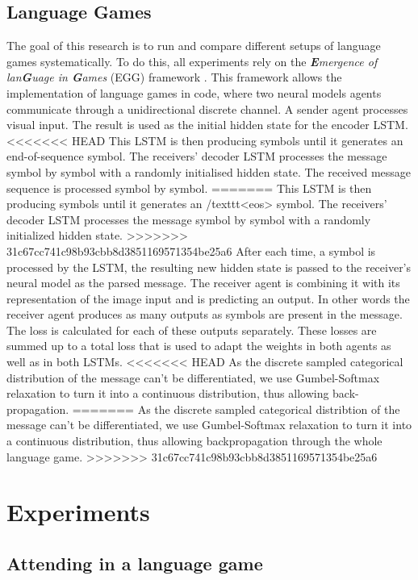 \documentclass[11pt]{article}
\begin{document}
\subsection{Language Games}
\label{sec:methodology:language-games}
The goal of this research is to run and compare different setups of language games systematically.
To do this, all experiments rely on the \emph{\textbf{E}mergence of lan\textbf{G}uage in \textbf{G}ames} (EGG) framework \citep{Kharitonov2019}.
This framework allows the implementation of language games in code, where two neural models agents communicate through a unidirectional discrete channel.
A sender agent processes visual input.
The result is used as the initial hidden state for the encoder LSTM.
<<<<<<< HEAD
This LSTM is then producing symbols until it generates an end-of-sequence symbol.
The receivers' decoder LSTM processes the message symbol by symbol with a randomly initialised hidden state.
The received message sequence is processed symbol by symbol.
=======
This LSTM is then producing symbols until it generates an /texttt{<eos>} symbol.
The receivers' decoder LSTM processes the message symbol by symbol with a randomly initialized hidden state.
>>>>>>> 31c67cc741c98b93cbb8d3851169571354be25a6
After each time, a symbol is processed by the LSTM, the resulting new hidden state is passed to the receiver's neural model as the parsed message.
The receiver agent is combining it with its representation of the image input and is predicting an output.
In other words the receiver agent produces as many outputs as symbols are present in the message.
The loss is calculated for each of these outputs separately.
These losses are summed up to a total loss that is used to adapt the weights in both agents as well as in both LSTMs.
<<<<<<< HEAD
As the discrete sampled categorical distribution of the message can't be differentiated, we use Gumbel-Softmax relaxation \citep{Jang2017} to turn it into a continuous distribution, thus allowing back-propagation.
=======
As the discrete sampled categorical distribtion of the message can't be differentiated, we use Gumbel-Softmax relaxation \citep{Jang2017} to turn it into a continuous distribution, thus allowing backpropagation through the whole language game.
>>>>>>> 31c67cc741c98b93cbb8d3851169571354be25a6

\section{Experiments}
\subsection{Attending in a language game}
\end{document}
